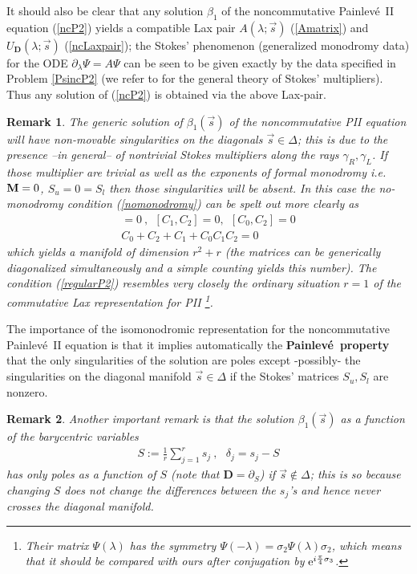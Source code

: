 \documentclass{article}
\newtheorem{remark}{Remark}[section]
\def \D{{\mathbf D}}
\def\b{\beta}
\def\br{\begin{remark}}
\def\er{\end{remark}}
\def\s{\sigma}
\def \pa{\partial}
\newcommand{\be}{\begin{eqnarray}}
\newcommand{\ee}{\end{eqnarray}}
\begin{document}
It should also be clear that any solution $\b_1$ of the noncommutative Painlev\'e\ II equation (\ref{ncP2}) yields a compatible Lax pair $A(\lambda;\vec s)$ (\ref{Amatrix}) and $U_\D(\lambda;\vec s)$ (\ref{ncLaxpair}); the Stokes' phenomenon (generalized monodromy data) for the ODE $\pa_\lambda\Psi = A\Psi$ can be seen to be given exactly by the data  specified in Problem \ref{PsincP2} (we refer to \cite{Wasow} for the general theory of Stokes' multipliers). Thus any solution of (\ref{ncP2}) is obtained via the above Lax-pair.

\br
The generic solution of $\b_1(\vec s)$ of the noncommutative PII equation will have non-movable singularities on the diagonals $\vec s\in \Delta$; this is due to the presence --in general-- of nontrivial Stokes multipliers along the rays $\gamma_R, \gamma_L$. If those multiplier are trivial  as well as the exponents of formal monodromy i.e. ${\bf M}=0$,  $S_u = 0= S_l$ then those singularities will be absent. In this case the no-monodromy condition (\ref{nomonodromy}) can be spelt out more clearly as 
\be
[C_0,C_1]= 0\ ,\ \ [C_1,C_2]=0,\ \ [C_0,C_2] = 0 \\
C_0+C_2+C_1 + C_0C_1 C_2 = 0
\label{regularP2}
\ee
which yields  a manifold of dimension $r^2 +r$ (the matrices can be generically diagonalized simultaneously and a simple counting yields this number).
The condition (\ref{regularP2}) resembles very closely the ordinary situation $r=1$ of the commutative Lax representation for PII \cite{Its:2002p9}\footnote{Their matrix $\Psi(\lambda)$ has  the symmetry $\Psi(-\lambda) = \s_2\Psi(\lambda)\s_2$, which means that it should be compared with ours after conjugation by ${\rm e}^{i\frac \pi 4 \s_3}$.}.
\er


The importance of the isomonodromic representation for the noncommutative Painlev\'e\ II equation  is that it implies automatically the {\bf Painlev\'e\ property} \cite{Palmer:Zeros} that the only singularities of the solution are poles except -possibly- the singularities on the diagonal manifold $\vec s\in \Delta$ if the Stokes' matrices $S_u,S_l$ are nonzero.

\br
\label{remPs}
Another important remark is that the solution $\b_1(\vec s)$ as a function of the barycentric variables 
\be
S:= \frac 1 r \sum_{j=1}^r s_j \ ,\ \ \ \delta_j = s_j-S
\ee
has only poles as a function of $S$ (note that $\D  = \pa_S$) if $\vec s\not \in \Delta$; this is so because changing $S$ does not change the differences between the $s_j$'s and hence never crosses the diagonal manifold.
\er
\end{document}
